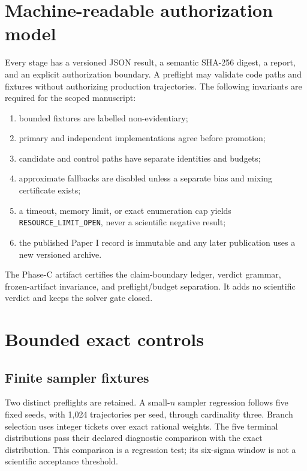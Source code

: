 \documentclass[11pt]{article}
\newcommand{\code}[1]{\texttt{#1}}
\begin{document}
\section{Machine-readable authorization model}

Every stage has a versioned JSON result, a semantic SHA-256 digest, a report,
and an explicit authorization boundary.  A preflight may validate code paths
and fixtures without authorizing production trajectories.  The following
invariants are required for the scoped manuscript:

\begin{enumerate}
  \item bounded fixtures are labelled non-evidentiary;
  \item primary and independent implementations agree before promotion;
  \item candidate and control paths have separate identities and budgets;
  \item approximate fallbacks are disabled unless a separate bias and mixing
        certificate exists;
  \item a timeout, memory limit, or exact enumeration cap yields
        \code{RESOURCE\_LIMIT\_OPEN}, never a scientific negative result;
  \item the published Paper I record is immutable and any later publication
        uses a new versioned archive.
\end{enumerate}

The Phase-C artifact certifies the claim-boundary ledger, verdict grammar,
frozen-artifact invariance, and preflight/budget separation.  It adds no
scientific verdict and keeps the solver gate closed.

\section{Bounded exact controls}

\subsection{Finite sampler fixtures}

Two distinct preflights are retained.  A small-$n$ sampler regression follows
five fixed seeds, with 1,024 trajectories per seed, through cardinality three.
Branch selection uses integer tickets over exact rational weights.  The five
terminal distributions pass their declared diagnostic comparison with the
exact distribution.  This comparison is a regression test; its six-sigma
window is not a scientific acceptance threshold.
\end{document}
